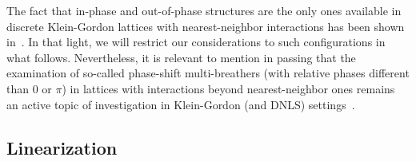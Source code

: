 \documentclass[12pt,reqno]{amsart}
\theoremstyle{definition}
\begin{document}
The fact that in-phase and out-of-phase structures
are the only ones available in discrete Klein-Gordon 
lattices with nearest-neighbor interactions
has been shown in~\cite{KOUKOULOYANNIS20132022}.
In that light, we will restrict our considerations
to such configurations in what follows. Nevertheless,
it is relevant to mention in passing that the examination 
of so-called phase-shift multi-breathers (with relative
phases different than $0$ or $\pi$) in lattices with
interactions beyond nearest-neighbor ones remains an
active topic of investigation in Klein-Gordon (and DNLS)
settings~\cite{PENATI201992}.

\subsection{Linearization}\label{sec:DKGlinear}
\end{document}
